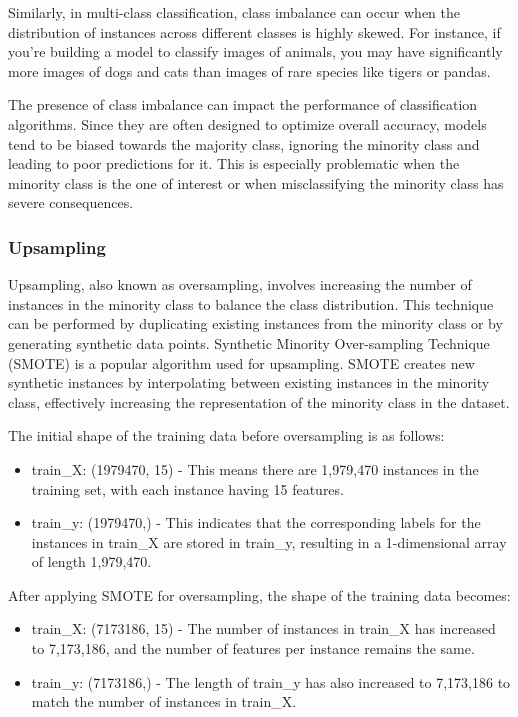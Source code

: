 \documentclass{article}
\begin{document}
Similarly, in multi-class classification, class imbalance can occur when the distribution of instances across different classes is highly skewed. For instance, if you're building a model to classify images of animals, you may have significantly more images of dogs and cats than images of rare species like tigers or pandas.

The presence of class imbalance can impact the performance of classification algorithms. Since they are often designed to optimize overall accuracy, models tend to be biased towards the majority class, ignoring the minority class and leading to poor predictions for it. This is especially problematic when the minority class is the one of interest or when misclassifying the minority class has severe consequences.


\subsubsection{Upsampling}
Upsampling, also known as oversampling, involves increasing the number of instances in the minority class to balance the class distribution. This technique can be performed by duplicating existing instances from the minority class or by generating synthetic data points. Synthetic Minority Over-sampling Technique (SMOTE) is a popular algorithm used for upsampling. SMOTE creates new synthetic instances by interpolating between existing instances in the minority class, effectively increasing the representation of the minority class in the dataset.

The initial shape of the training data before oversampling is as follows:
\begin{itemize}
    \item train\_X: (1979470, 15) - This means there are 1,979,470 instances in the training set, with each instance having 15 features.
    \item train\_y: (1979470,) - This indicates that the corresponding labels for the instances in train\_X are stored in train\_y, resulting in a 1-dimensional array of length 1,979,470.
\end{itemize}

After applying SMOTE for oversampling, the shape of the training data becomes:
\begin{itemize}
    \item train\_X: (7173186, 15) - The number of instances in train\_X has increased to 7,173,186, and the number of features per instance remains the same.
    \item train\_y: (7173186,) - The length of train\_y has also increased to 7,173,186 to match the number of instances in train\_X.
\end{itemize}
\end{document}
